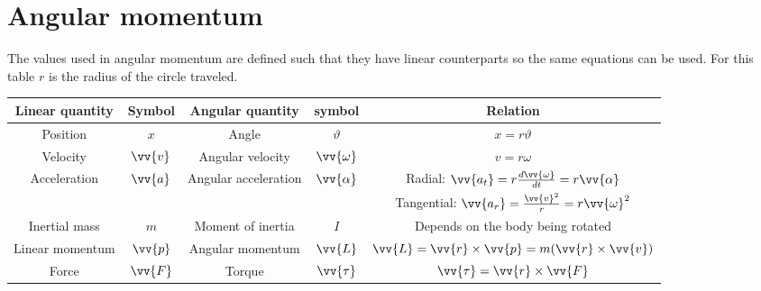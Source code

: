 \documentclass{article}
\begin{document}
\section*{Angular momentum}

The values used in angular momentum are defined such that they have linear counterparts so the same equations can be used. For this table \(r\) is the radius of the circle traveled.
\begin{center}
\begin{tabular}{|c|c|c|c|c|} \hline
Linear quantity & Symbol & Angular quantity &  symbol & Relation\\ \hline
Position & \(x\) & Angle & \(\vartheta\) & \(x=r\vartheta\)\\
Velocity & \(\vv{v}\) & Angular velocity & \(\vv{\omega}\) & \(v=r\omega\)\\
Acceleration & \(\vv{a}\) & Angular acceleration & \(\vv{\alpha}\) & Radial: \(\vv{a_t}=r\frac{d\vv{\omega}}{dt}=r\vv{\alpha}\) \\
~&~&~&~&Tangential: \(\vv{a_r}=\frac{\vv{v}^2}{r}=r\vv{\omega}^2\)\\
Inertial mass & \(m\) & Moment of inertia & \(I\) & Depends on the body being rotated\\
Linear momentum & \(\vv{p}\) & Angular momentum & \(\vv{L}\) & \(\vv{L}=\vv{r}\times\vv{p}=m(\vv{r}\times\vv{v})\)\\
Force & \(\vv{F}\) & Torque & \(\vv{\tau}\) & \(\vv{\tau}=\vv{r}\times\vv{F}\)\\ \hline
\end{tabular}
\end{center}
\end{document}
